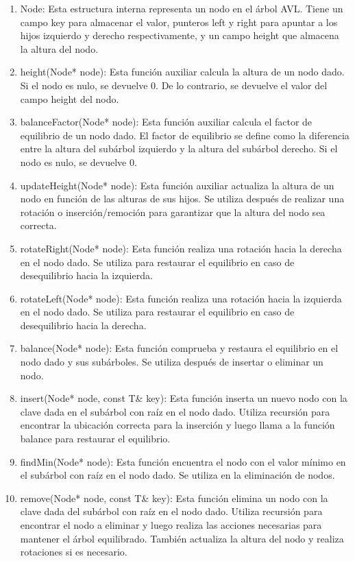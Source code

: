 \documentclass[]{article}
\begin{document}
\begin{enumerate}
    \item Node: Esta estructura interna representa un nodo en el árbol AVL. Tiene un campo key para almacenar el valor, punteros left y right para apuntar a los hijos izquierdo y derecho respectivamente, y un campo height que almacena la altura del nodo.
    \item height(Node* node): Esta función auxiliar calcula la altura de un nodo dado. Si el nodo es nulo, se devuelve 0. De lo contrario, se devuelve el valor del campo height del nodo.
    \item balanceFactor(Node* node): Esta función auxiliar calcula el factor de equilibrio de un nodo dado. El factor de equilibrio se define como la diferencia entre la altura del subárbol izquierdo y la altura del subárbol derecho. Si el nodo es nulo, se devuelve 0.
    \item updateHeight(Node* node): Esta función auxiliar actualiza la altura de un nodo en función de las alturas de sus hijos. Se utiliza después de realizar una rotación o inserción/remoción para garantizar que la altura del nodo sea correcta.
    \item rotateRight(Node* node): Esta función realiza una rotación hacia la derecha en el nodo dado. Se utiliza para restaurar el equilibrio en caso de desequilibrio hacia la izquierda.
    \item rotateLeft(Node* node): Esta función realiza una rotación hacia la izquierda en el nodo dado. Se utiliza para restaurar el equilibrio en caso de desequilibrio hacia la derecha.
    \item balance(Node* node): Esta función comprueba y restaura el equilibrio en el nodo dado y sus subárboles. Se utiliza después de insertar o eliminar un nodo.
    \item insert(Node* node, const T\& key): Esta función inserta un nuevo nodo con la clave dada en el subárbol con raíz en el nodo dado. Utiliza recursión para encontrar la ubicación correcta para la inserción y luego llama a la función balance para restaurar el equilibrio.
    \item findMin(Node* node): Esta función encuentra el nodo con el valor mínimo en el subárbol con raíz en el nodo dado. Se utiliza en la eliminación de nodos.
    \item remove(Node* node, const T\& key): Esta función elimina un nodo con la clave dada del subárbol con raíz en el nodo dado. Utiliza recursión para encontrar el nodo a eliminar y luego realiza las acciones necesarias para mantener el árbol equilibrado. También actualiza la altura del nodo y realiza rotaciones si es necesario.

\end{enumerate}
\end{document}
